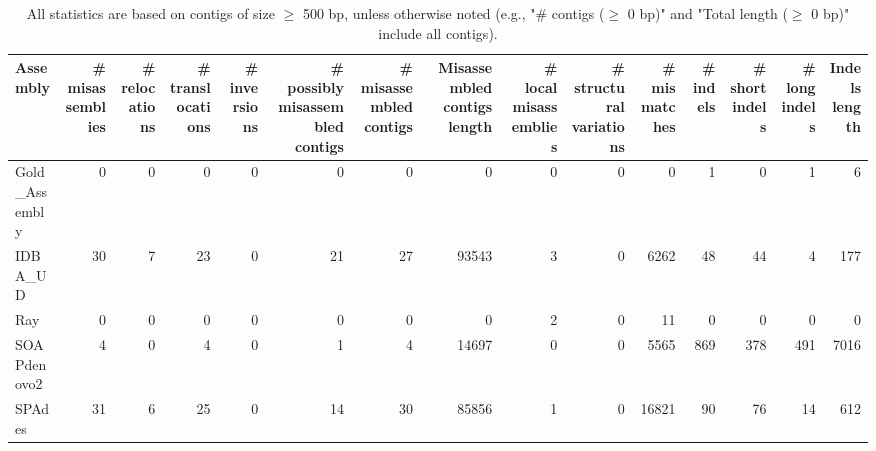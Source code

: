 \documentclass[12pt,a4paper]{article}
\begin{document}
\begin{table}[ht]
\begin{center}
\caption{All statistics are based on contigs of size $\geq$ 500 bp, unless otherwise noted (e.g., "\# contigs ($\geq$ 0 bp)" and "Total length ($\geq$ 0 bp)" include all contigs).}
\begin{tabular}{|l*{14}{|r}|}
\hline
Assembly & \# misassemblies &     \# relocations &     \# translocations &     \# inversions & \# possibly misassembled contigs & \# misassembled contigs & Misassembled contigs length & \# local misassemblies & \# structural variations & \# mismatches & \# indels &     \# short indels &     \# long indels & Indels length \\ \hline
Gold\_Assembly & 0 & 0 & 0 & 0 & 0 & 0 & 0 & 0 & 0 & 0 & 1 & 0 & 1 & 6 \\ \hline
IDBA\_UD & 30 & 7 & 23 & 0 & 21 & 27 & 93543 & 3 & 0 & 6262 & 48 & 44 & 4 & 177 \\ \hline
Ray & 0 & 0 & 0 & 0 & 0 & 0 & 0 & 2 & 0 & 11 & 0 & 0 & 0 & 0 \\ \hline
SOAPdenovo2 & 4 & 0 & 4 & 0 & 1 & 4 & 14697 & 0 & 0 & 5565 & 869 & 378 & 491 & 7016 \\ \hline
SPAdes & 31 & 6 & 25 & 0 & 14 & 30 & 85856 & 1 & 0 & 16821 & 90 & 76 & 14 & 612 \\ \hline
\end{tabular}
\end{center}
\end{table}
\end{document}
